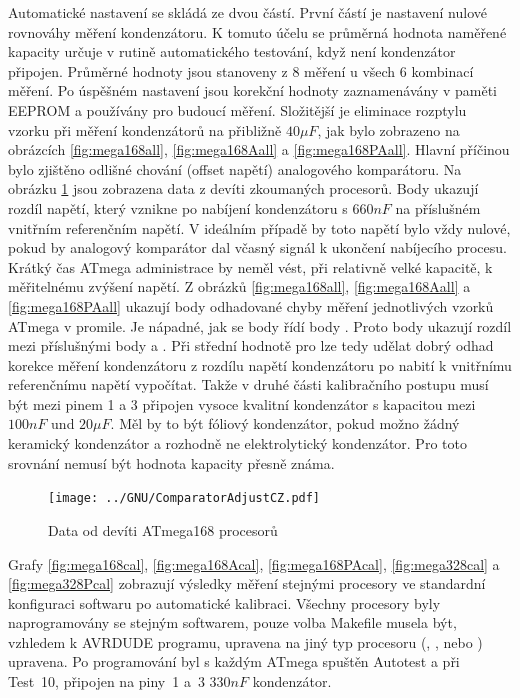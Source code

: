 Automatické nastavení se skládá ze dvou částí.
První částí je nastavení nulové rovnováhy měření kondenzátoru.
K tomuto účelu se průměrná hodnota naměřené kapacity určuje v rutině automatického testování, když není kondenzátor připojen.
Průměrné hodnoty jsou stanoveny z 8 měření u všech 6 kombinací měření.
Po úspěšném nastavení jsou korekční hodnoty zaznamenávány v paměti EEPROM a používány pro budoucí měření.
Složitější je eliminace rozptylu vzorku při měření kondenzátorů na přibližně \(40\mu F\),
jak bylo zobrazeno na obrázcích \ref{fig:mega168all}, \ref{fig:mega168Aall} a \ref{fig:mega168PAall}.
Hlavní příčinou bylo zjištěno odlišné chování (offset napětí) analogového komparátoru.
Na obrázku \ref{fig:CompAdjust} jsou zobrazena data z devíti zkoumaných procesorů.
Body  ukazují rozdíl napětí, který vznikne po nabíjení kondenzátoru s \(660nF\) na
příslušném vnitřním referenčním napětí.
V ideálním případě by toto napětí bylo vždy nulové, pokud by analogový komparátor dal
včasný signál k ukončení nabíjecího procesu.
Krátký čas  ATmega administrace by neměl vést, při relativně velké kapacitě, k měřitelnému zvýšení napětí.
Z obrázků \ref{fig:mega168all}, \ref{fig:mega168Aall} a \ref{fig:mega168PAall} ukazují body  
odhadované chyby měření jednotlivých vzorků ATmega v promile.
Je nápadné, jak se body  řídí body .
Proto body   ukazují rozdíl mezi příslušnými body  a .
Při střední hodnotě pro  lze tedy udělat dobrý odhad korekce měření kondenzátoru z rozdílu
napětí kondenzátoru po nabití k vnitřnímu referenčnímu napětí vypočítat.
Takže v druhé části kalibračního postupu musí být mezi pinem 1 a 3 připojen vysoce kvalitní
kondenzátor s kapacitou mezi \(100nF\) und \(20\mu F\).
Měl by to být fóliový kondenzátor, pokud možno žádný keramický kondenzátor a rozhodně ne
elektrolytický kondenzátor.
Pro toto srovnání nemusí být hodnota kapacity  přesně známa.

\begin{figure}[H]
\centering
\texttt{[image: ../GNU/ComparatorAdjustCZ.pdf]}
\caption{Data od devíti ATmega168 procesorů}
\label{fig:CompAdjust}
\end{figure}

Grafy \ref{fig:mega168cal}, \ref{fig:mega168Acal}, \ref{fig:mega168PAcal},  \ref{fig:mega328cal} a
\ref{fig:mega328Pcal} zobrazují výsledky měření stejnými procesory ve standardní konfiguraci
softwaru po automatické kalibraci.
Všechny procesory byly naprogramovány se stejným softwarem, pouze volba
Makefile  musela být, vzhledem k AVRDUDE programu,
upravena na jiný typ procesoru (, ,  nebo ) upravena.
Po programování byl s každým ATmega spuštěn Autotest a při Test~10, připojen na piny~1 a~3 \(330nF\) kondenzátor.

